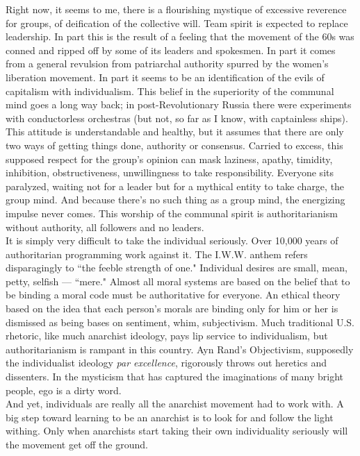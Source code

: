 \documentclass[12pt, onecolumn, letterpaper, oneside]{book}
\begin{document}
Right now, it seems to me, there is a flourishing mystique of excessive reverence for groups, of deification of the collective will. Team spirit is expected to replace leadership. In part this is the result of a feeling that the movement of the 60s was conned and ripped off by some of its leaders and spokesmen. In part it comes from a general revulsion from patriarchal authority spurred by the women's liberation movement. In part it seems to be an identification of the evils of capitalism with individualism. This belief in the superiority of the communal mind goes a long way back; in post-Revolutionary Russia there were experiments with conductorless orchestras (but not, so far as I know, with captainless ships). This attitude is understandable and healthy, but it assumes that there are only two ways of getting things done, authority or consensus. Carried to excess, this supposed respect for the group's opinion can mask laziness, apathy, timidity, inhibition, obstructiveness, unwillingness to take responsibility. Everyone sits paralyzed, waiting not for a leader but for a mythical entity to take charge, the group mind. And because there's no such thing as a group mind, the energizing impulse never comes. This worship of the communal spirit is authoritarianism without authority, all followers and no leaders.\\
It is simply very difficult to take the individual seriously. Over 10,000 years of authoritarian programming work against it. The I.W.W. anthem refers disparagingly to ``the feeble strength of one." Individual desires are small, mean, petty, selfish --- ``mere." Almost all moral systems are based on the belief that to be binding a moral code must be authoritative for everyone. An ethical theory based on the idea that each person's morals are binding only for him or her is dismissed as being bases on sentiment, whim, subjectivism. Much traditional U.S. rhetoric, like much anarchist ideology, pays lip service to individualism, but authoritarianism is rampant in this country. Ayn Rand's Objectivism, supposedly the individualist ideology \emph{par excellence}, rigorously throws out heretics and dissenters. In the mysticism that has captured the imaginations of many bright people, ego is a dirty word.\\
And yet, individuals are really all the anarchist movement had to work with. A big step toward learning to be an anarchist is to look for and follow the light withing. Only when anarchists start taking their own individuality seriously will the movement get off the ground.\\
\end{document}
